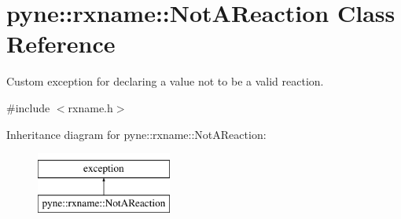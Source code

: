 \hypertarget{classpyne_1_1rxname_1_1_not_a_reaction}{}\section{pyne\+:\+:rxname\+:\+:Not\+A\+Reaction Class Reference}
\label{classpyne_1_1rxname_1_1_not_a_reaction}


Custom exception for declaring a value not to be a valid reaction.  




{\ttfamily \#include $<$rxname.\+h$>$}

Inheritance diagram for pyne\+:\+:rxname\+:\+:Not\+A\+Reaction\+:\begin{figure}[H]
\begin{center}
\leavevmode
\includegraphics[height=2.000000cm]{classpyne_1_1rxname_1_1_not_a_reaction}
\end{center}
\end{figure}
